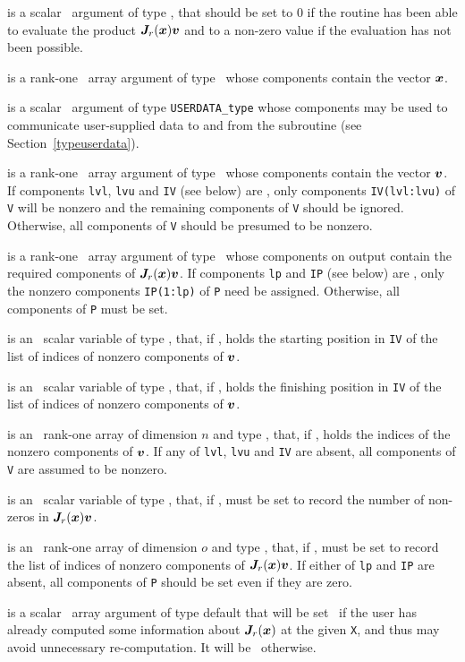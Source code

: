 \documentclass{galahad}
\begin{document}
\begin{description}
 is a scalar \intentout\ argument of type \integer,
that should be set to 0 if the routine has been able to evaluate the
product ${\bm{J}}_r({\bm{x}}) {\bm{v}}$
and to a non-zero value if the evaluation has not been possible.

 is a rank-one \intentin\ array argument of type \realdp\
whose components contain the vector ${\bm{x}}$.

 is a scalar \intentinout\ argument of type
{\tt USERDATA\_type} whose components may be used
to communicate user-supplied data to and from the
subroutine (see Section~\ref{typeuserdata}).

 is a rank-one \intentin\ array argument of type \realdp\
whose components contain the vector ${\bm{v}}$.
If components
{\tt lvl},
{\tt lvu}
and
{\tt IV}
(see below) are \present,
only components {\tt IV(lvl:lvu)} of {\tt V}
will be nonzero and the remaining components of {\tt V} should be
ignored. Otherwise, all components of {\tt V} should be presumed to be nonzero.

\ittf{P} is a rank-one \intentout\ array argument of type \realdp\
whose components on output contain the required components of ${\bm{J}}_r({\bm{x}}) {\bm{v}}$.
If components
{\tt lp}
and
{\tt IP}
(see below) are \present,
only the nonzero components {\tt IP(1:lp)} of {\tt P}
need be assigned.
Otherwise, all components of {\tt P} must be set.

\itt{lvl} is an \optional\ scalar variable of type \integer,
that, if \present, holds the starting position in {\tt IV}
of the list of indices of nonzero components of ${\bm{v}}$.

\itt{lvu} is an \optional\ scalar variable of type \integer,
that, if \present, holds the finishing position in {\tt IV}
of the list of indices of nonzero components of ${\bm{v}}$.

\itt{IV} is an \optional\  rank-one array of dimension $n$
and type \integer, that, if \present, holds the indices of the
nonzero components of ${\bm{v}}$. If any of
{\tt lvl},
{\tt lvu}
and
{\tt IV}
are absent, all components of {\tt V} are assumed to be nonzero.

\itt{lp} is an \optional\ scalar variable of type \integer,
that, if \present, must be set to record the number of non-zeros in
${\bm{J}}_r({\bm{x}}) {\bm{v}}$.

\itt{IP} is an \optional\ rank-one array of dimension $o$
and type \integer, that, if \present, must be set to record the list
of indices of nonzero components of ${\bm{J}}_r({\bm{x}}) {\bm{v}}$.
If either of
{\tt lp}
and
{\tt IP}
are absent, all components of {\tt P} should be set even if they are zero.

 is a scalar \intentin\ array argument of type
default that will be set \true\ if the user has already computed
some information about ${\bm{J}}_r({\bm{x}})$ at the given {\tt X}, and thus
may avoid unnecessary re-computation. It will be \false\ otherwise.

\end{description}
\end{document}
